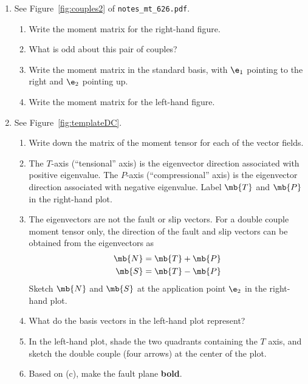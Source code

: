 \documentclass[11pt,titlepage,fleqn]{article}
\newcommand{\mtfile}{\texttt{notes\_mt\_626.pdf}}
\begin{document}
\begin{enumerate}
\begin{enumerate}
Draw the base of each vector at the tip of $\e_1$, $-\e_1$, $\e_2$, or $-\e_2$.

Here, draw all forces as unit vectors. 

\item Which entries of the matrix represent the classical description of the double couple?
(See ``Nomenclature confusion'' in \mtfile.)
\end{enumerate}


\item See Figure~\ref{fig:couples2} of \mtfile.
%
\begin{enumerate}
\item Write the moment matrix for the right-hand figure.
\item What is odd about this pair of couples?
\item Write the moment matrix in the standard basis, with $\e_1$ pointing to the right and $\e_2$ pointing up.
\item Write the moment matrix for the left-hand figure.
\end{enumerate}


\item See Figure~\ref{fig:templateDC}.
%
\begin{enumerate}
\item Write down the matrix of the moment tensor for each of the vector fields.
\item The $T$-axis (``tensional'' axis) is the eigenvector direction associated with positive eigenvalue. The $P$-axis (``compressional'' axis) is the eigenvector direction associated with negative eigenvalue. Label $\mb{T}$ and $\mb{P}$ in the right-hand plot.
\item The eigenvectors are not the fault or slip vectors. For a double couple moment tensor only, the direction of the fault and slip vectors can be obtained from the eigenvectors as 
%
\begin{eqnarray*}
\mb{N} = \mb{T} + \mb{P}
\\
\mb{S} = \mb{T} - \mb{P}
\end{eqnarray*}
%
Sketch $\mb{N}$ and $\mb{S}$ at the application point $\e_2$ in the right-hand plot.
\item What do the basis vectors in the left-hand plot represent?
\item In the left-hand plot, shade the two quadrants containing the $T$ axis, and sketch the double couple (four arrows) at the center of the plot.
\item Based on (c), make the fault plane {\bf bold}.
\end{enumerate}


\end{enumerate}
\end{document}
